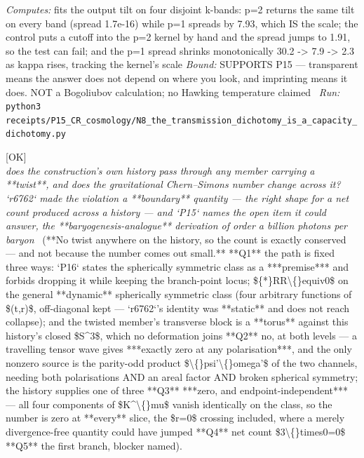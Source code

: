\begin{description}
\emph{Computes:} fits the output tilt on four disjoint k-bands: p=2 returns the same tilt on every band (spread 1.7e-16) while p=1 spreads by 7.93, which IS the scale; the control puts a cutoff into the p=2 kernel by hand and the spread jumps to 1.91, so the test can fail; and the p=1 spread shrinks monotonically 30.2 -> 7.9 -> 2.3 as kappa rises, tracking the kernel's scale
 \emph{Bound:} SUPPORTS P15 --- transparent means the answer does not depend on where you look, and imprinting means it does. NOT a Bogoliubov calculation; no Hawking temperature claimed
\ \emph{Run:} \texttt{python3 receipts/P15\_CR\_cosmology/N8\_the\_transmission\_dichotomy\_is\_a\_capacity\_dichotomy.py}
\item[\rcptlabel{P15_the_history_is_spherically_symmetric_throughout_so_the_chern_simons_number_never_moves}{P15R152}\textbf{P15R152}\quad\texttt{P15\_the\_history\_is\_spherically\_symmetric\_throughout\_so\_the\_chern\_simons\_number\_never\_moves}]\hfill\textsf{[OK]}\\
\textit{does the construction's own history pass through any member carrying a **twist**, and does the gravitational Chern--Simons number change across it? `r6762` made the violation a **boundary** quantity --- the right shape for a net count produced across a history --- and `P15` names the open item it could answer, the **baryogenesis-analogue** derivation of order a billion photons per baryon} \ (**No twist anywhere on the history, so the count is exactly conserved --- and not because the number comes out small.**  **Q1** the path is fixed three ways: `P16` states the spherically symmetric class as a ***premise*** and forbids dropping it while keeping the branch-point locus; \$\{*\}RR\textbackslash\{\}equiv0\$ on the general **dynamic** spherically symmetric class (four arbitrary functions of \$(t,r)\$, off-diagonal kept --- `r6762`'s identity was **static** and does not reach collapse); and the twisted member's transverse block is a **torus** against this history's closed \$S\textasciicircum{}3\$, which no deformation joins  **Q2** no, at both levels --- a travelling tensor wave gives ***exactly zero at any polarisation***, and the only nonzero source is the parity-odd product \$\textbackslash\{\}psi'\textbackslash\{\}omega'\$ of the two channels, needing both polarisations AND an areal factor AND broken spherical symmetry; the history supplies one of three  **Q3** ***zero, and endpoint-independent*** --- all four components of \$K\textasciicircum{}\textbackslash\{\}mu\$ vanish identically on the class, so the number is zero at **every** slice, the \$r=0\$ crossing included, where a merely divergence-free quantity could have jumped  **Q4** net count \$3\textbackslash\{\}times0=0\$  **Q5** the first branch, blocker named). 

\end{description}
